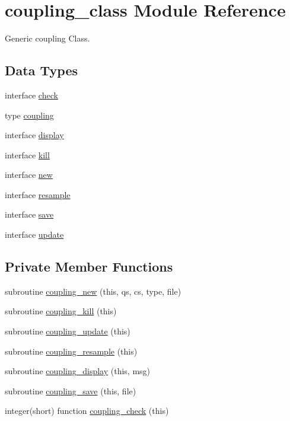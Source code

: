 \hypertarget{classcoupling__class}{\section{coupling\+\_\+class Module Reference}
\label{classcoupling__class}
}


Generic coupling Class.  


\subsection*{Data Types}
\begin{DoxyCompactItemize}
\item 
interface \hyperlink{interfacecoupling__class_1_1check}{check}
\item 
type \hyperlink{structcoupling__class_1_1coupling}{coupling}
\item 
interface \hyperlink{interfacecoupling__class_1_1display}{display}
\item 
interface \hyperlink{interfacecoupling__class_1_1kill}{kill}
\item 
interface \hyperlink{interfacecoupling__class_1_1new}{new}
\item 
interface \hyperlink{interfacecoupling__class_1_1resample}{resample}
\item 
interface \hyperlink{interfacecoupling__class_1_1save}{save}
\item 
interface \hyperlink{interfacecoupling__class_1_1update}{update}
\end{DoxyCompactItemize}
\subsection*{Private Member Functions}
\begin{DoxyCompactItemize}
\item 
subroutine \hyperlink{classcoupling__class_a5fa07e475bf96111bc76820037fc26a4}{coupling\+\_\+new} (this, qs, cs, type, file)
\item 
subroutine \hyperlink{classcoupling__class_a774339d5b87453601c0664a199df7823}{coupling\+\_\+kill} (this)
\item 
subroutine \hyperlink{classcoupling__class_a034f9e137631afdb03a75cc32bf1956d}{coupling\+\_\+update} (this)
\item 
subroutine \hyperlink{classcoupling__class_ad26da11333ea64f68c25250a35287a51}{coupling\+\_\+resample} (this)
\item 
subroutine \hyperlink{classcoupling__class_a543d9a76307b2c60048d8f390fb40859}{coupling\+\_\+display} (this, msg)
\item 
subroutine \hyperlink{classcoupling__class_af46ffcc2d49425d21e248f173b5377bd}{coupling\+\_\+save} (this, file)
\item 
integer(short) function \hyperlink{classcoupling__class_a41b687a0ad543c445aa29923c229e39d}{coupling\+\_\+check} (this)
\end{DoxyCompactItemize}


